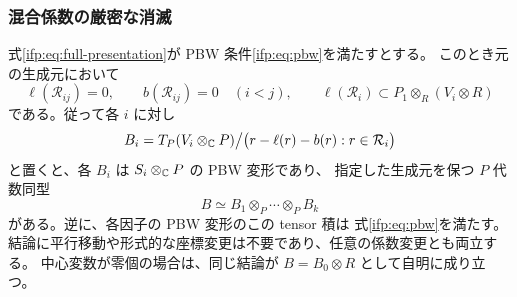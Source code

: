 \subsubsection{混合係数の厳密な消滅}

\begin{theorem}
\label{ifp:thm:factorization}
式\eqref{ifp:eq:full-presentation}が PBW 条件\eqref{ifp:eq:pbw}を満たすとする。
このとき元の生成元において
\begin{equation}\label{ifp:eq:vanishing}
 \ell(\mathcal R_{ij})=0,\qquad b(\mathcal R_{ij})=0\quad(i<j),
       \qquad \ell(\mathcal R_i)\subset P_1\otimes_R(V_i\otimes R)
\end{equation}
である。従って各 $i$ に対し
\[
 B_i=T_P(V_i\otimes_{\mathbb C}P)
       \big/\bigl(r-\ell(r)-b(r):r\in\mathcal R_i\bigr)
\]
と置くと、各 $B_i$ は $S_i\otimes_{\mathbb C}P$ の PBW 変形であり、
指定した生成元を保つ $P$ 代数同型
\begin{equation}\label{ifp:eq:tensor-factorization}
                    B\simeq B_1\otimes_P\cdots\otimes_PB_k
\end{equation}
がある。逆に、各因子の PBW 変形のこの tensor 積は
式\eqref{ifp:eq:pbw}を満たす。
結論に平行移動や形式的な座標変更は不要であり、任意の係数変更とも両立する。
中心変数が零個の場合は、同じ結論が $B=B_0\otimes R$ として自明に成り立つ。
\end{theorem}

